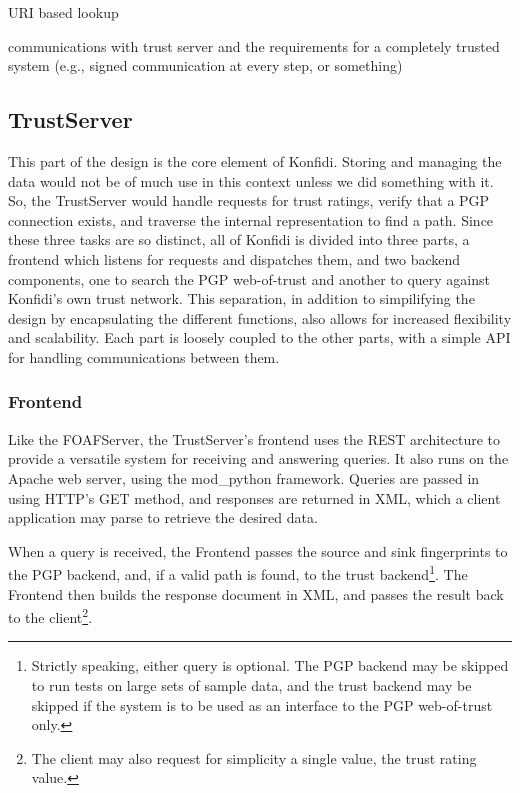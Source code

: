 \documentclass{acm_proc_article-sp}
\begin{document}
URI based lookup

communications with trust server and the requirements for a completely trusted system (e.g., signed communication at every step, or something)

\subsection{TrustServer}
This part of the design is the core element of Konfidi.  Storing and managing the data would not be of much use in this context unless we did something with it.  So, the TrustServer would handle requests for trust ratings, verify that a PGP connection exists, and traverse the internal representation to find a path.  Since these three tasks are so distinct, all of Konfidi is divided into three parts, a frontend which listens for requests and dispatches them, and two backend components, one to search the PGP web-of-trust and another to query against Konfidi's own trust network.  This separation, in addition to simpilifying the design by encapsulating the different functions, also allows for increased flexibility and scalability.  Each part is loosely coupled to the other parts, with a simple API for handling communications between them.

\subsubsection{Frontend}
Like the FOAFServer, the TrustServer's frontend uses the REST architecture to provide a versatile system for receiving and answering queries. 
It also runs on the Apache web server, using the mod\_python framework.  Queries are passed in using HTTP's GET method, and responses are returned in XML, which a client application may parse to retrieve the desired data.

When a query is received, the Frontend passes the source and sink fingerprints to the PGP backend, and, if a valid path is found, to the trust backend\footnote{Strictly speaking, either query is optional.  The PGP backend may be skipped to run tests on large sets of sample data, and the trust backend may be skipped if the system is to be used as an interface to the PGP web-of-trust only.}.  The Frontend then builds the response document in XML, and passes the result back to the client\footnote{The client may also request for simplicity a single value, the trust rating value.}.
\end{document}
